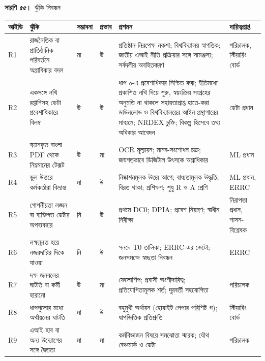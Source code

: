 \documentclass[border=10pt]{standalone}
\begin{document}
\begin{minipage}{22cm}
{\large\bfseries সারণি ৫৫।}\ {\large ঝুঁকি নিবন্ধন}\par\vspace{7pt}
\small
{}
\begin{tabularx}{\linewidth}{@{}>{\hsize=0.347\hsize\raggedright\arraybackslash}X>{\hsize=1.579\hsize\raggedright\arraybackslash}X>{\hsize=0.632\hsize\raggedright\arraybackslash}X>{\hsize=0.474\hsize\raggedright\arraybackslash}X>{\hsize=2.084\hsize\raggedright\arraybackslash}X>{\hsize=0.884\hsize\raggedright\arraybackslash}X@{}}
\arrayrulecolor{bapilrule}\toprule
\rowcolor{white}\textbf{আইডি} & \textbf{ঝুঁকি} & \textbf{সম্ভাবনা} & \textbf{প্রভাব} & \textbf{প্রশমন} & \textbf{দায়িত্বপ্রাপ্ত} \\
\midrule
R1 & রাজনৈতিক বা প্রাতিষ্ঠানিক পরিবর্তনে অগ্রাধিকার বদল & মা & উ & প্রতিষ্ঠান-নিরপেক্ষ নকশা; বিশ্ববিদ্যালয় স্বাগতিক; জাতীয় এআই নীতি প্রক্রিয়ার সঙ্গে সামঞ্জস্য; সর্বদলীয় অবহিতকরণ & পরিচালক, স্টিয়ারিং বোর্ড \\
R2 & একসঙ্গে নথি রপ্তানিসহ ডেটা প্রবেশাধিকারে বিলম্ব & উ & উ & ধাপ ০-এ প্রবেশাধিকার নিশ্চিত করা; ইতিমধ্যে প্রকাশিত নথি দিয়ে শুরু, স্বয়ংক্রিয় সংগ্রহের অনুমতি না থাকলে সহায়তাপ্রাপ্ত হাতে-করা ডাউনলোড ও বিশ্ববিদ্যালয়ের আইন-গ্রন্থাগারের মাধ্যমে; NRDEX চুক্তি; বিকল্প হিসেবে তথ্য অধিকার আবেদন & ডেটা প্রধান \\
R3 & স্ক্যানকৃত বাংলা PDF থেকে নিম্নমানের টেক্সট & উ & মা & OCR মূল্যায়ন; মানব-সংশোধন চক্র; জন্মগতভাবে ডিজিটাল উৎসকে অগ্রাধিকার & ML প্রধান \\
R4 & ভুল উত্তরে কর্মকর্তারা বিভ্রান্ত & মা & উ & নিষ্কাশনমূলক উত্তর আগে; বাধ্যতামূলক উদ্ধৃতি; বিরত থাকা; প্রশিক্ষণ; শুধু R ও A শ্রেণি & ML প্রধান, ERRC \\
R5 & গোপনীয়তা লঙ্ঘন বা ব্যক্তিগত ডেটার অপব্যবহার & নি & উ & প্রথমে DC0; DPIA; প্রবেশ নিয়ন্ত্রণ; স্বাধীন নিরীক্ষা & নিরাপত্তা প্রধান, শাসন-বিশ্লেষক \\
R6 & লক্ষ্যচ্যুত হয়ে নজরদারির দিকে যাওয়া & নি & উ & সনদে T0 তালিকা; ERRC-এর ভেটো; জনসমক্ষে স্বচ্ছতা নিবন্ধন & ERRC \\
R7 & দক্ষ জনবলের ঘাটতি বা কর্মী হারানো & উ & মা & ফেলোশিপ; প্রবাসী অংশীদারিত্ব; প্রতিযোগিতামূলক শর্ত; দূরবর্তী সহযোগিতা & পরিচালক \\
R8 & ধাপগুলোর মধ্যে অর্থায়নের ঘাটতি & মা & উ & বহুমুখী অর্থায়ন (হোয়াইট পেপার পরিশিষ্ট গ); ধাপভিত্তিক প্রতিশ্রুতি & স্টিয়ারিং বোর্ড \\
R9 & এআই হাব বা অন্য উদ্যোগের সঙ্গে দ্বৈততা & মা & মা & কর্মবিভাজন বিষয়ে সমঝোতা স্মারক; যৌথ বেঞ্চমার্ক ও ডেটা & পরিচালক \\

\end{tabularx}
\end{minipage}
\end{document}
